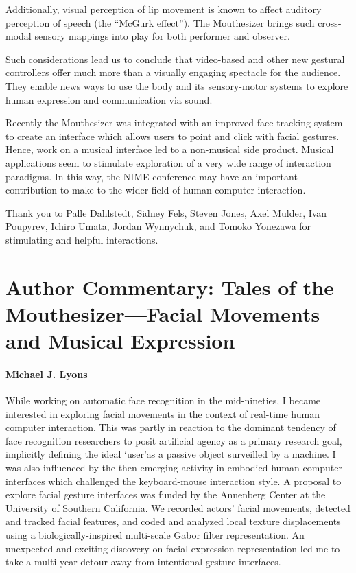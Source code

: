 Additionally, visual perception of lip movement is known to affect auditory perception of speech \cite{McGurk:1976} (the “McGurk effect”). The Mouthesizer brings such cross-modal sensory mappings into play for both performer and observer. 

Such considerations lead us to conclude that video-based and other new gestural controllers offer much more than a visually engaging spectacle for the audience. They enable news ways to use the body and its sensory-motor systems to explore human expression and communication via sound. 

Recently the Mouthesizer was integrated with an improved face tracking system to create an interface which allows users to point and click with facial gestures. Hence, work on a musical interface led to a non-musical side product. Musical applications seem to stimulate exploration of a very wide range of interaction paradigms. In this way, the NIME conference may have an important contribution to make to the wider field of human-computer interaction. 

\begin{acknowledgement}
Thank you to Palle Dahlstedt, Sidney Fels, Steven Jones, Axel Mulder, Ivan Poupyrev, Ichiro Umata, Jordan Wynnychuk, and Tomoko Yonezawa for stimulating and helpful interactions.
\end{acknowledgement}


\section*{Author Commentary: Tales of the Mouthesizer---Facial Movements and Musical Expression}
\paragraph{Michael J. Lyons}

While working on automatic face recognition in the mid-nineties, I became interested in exploring facial movements in the context of real-time human computer interaction. This was partly in reaction to the dominant tendency of face recognition researchers to posit artificial agency as a primary research goal, implicitly defining the ideal \lq user\rq as a passive object surveilled by a machine. I was also influenced by the then emerging activity in embodied human computer interfaces which challenged the keyboard-mouse interaction style. A proposal to explore facial gesture interfaces was funded by the Annenberg Center at the University of Southern California. We recorded actors' facial movements,  detected and tracked facial features, and coded and analyzed local texture displacements using a biologically-inspired multi-scale Gabor filter representation. An unexpected and exciting discovery on facial expression representation led me to take a multi-year detour away from intentional gesture interfaces.

